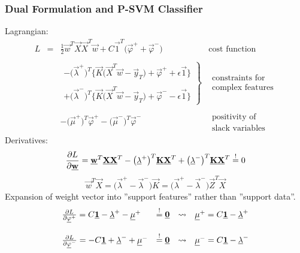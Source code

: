 \subsubsection{Dual Formulation and P-SVM Classifier}
Lagrangian:
\begin{equation}
	\begin{array}{lllc}
	L 
	& = & \frac{1}{2} \vec{w}^T \vec{X} \vec{X}^T \vec{w} + 
		C \vec{1}^T \big( \vec{\varphi}^+ + \vec{\varphi}^- \big)
		& \text{cost function} \\\\
	&& \left. \begin{array}{l}
		- \big( \vec{\lambda}^+ \big)^T \Big\{
			\vec{K} \big( \vec{X}^T \vec{w} - \vec{y}_T \big)
			+ \vec{\varphi}^+ + \epsilon \vec{1} \Big\} \\\\
		+ \big( \vec{\lambda}^- \big)^T \Big\{
			\vec{K}\big( \vec{X}^T \vec{w} - \vec{y}_T \big)
			+ \vec{\varphi}^- - \epsilon \vec{1} \Big\}
	\end{array} \right \} & \substack{ \text{constraints for} \\
					\text{complex features} } \\\\
	&& - \big( \vec{\mu}^+ \big)^T \vec{\varphi}^+ - \big( \vec{\mu}^-
		\big)^T \vec{\varphi}^-
		& \substack{ \text{positivity of} \\
				\text{slack variables} }
	\end{array}
\end{equation}
Derivatives:
\begin{equation}
	\frac{\partial L}{\partial \underline{\mathbf{w}}} = \underline{\mathbf{w}}^T \underline{\mathbf{X}} \underline{\mathbf{X}}^T
		- \big( \underline{\mathbf{\lambda}}^+ \big)^T \underline{\mathbf{K}} \underline{\mathbf{X}}^T
		+ \big( \underline{\mathbf{\lambda}}^- \big)^T \underline{\mathbf{K}} \underline{\mathbf{X}}^T 
	\stackrel{\mathrm{!}}{=} 0
\end{equation}
\begin{equation}
	\vec{w}^T \vec{X} = \big( \vec{\lambda}^+ - \vec{\lambda}^- \big)
		\vec{K} = \big( \vec{\lambda}^+ - \vec{\lambda}^- \big)
		\vec{Z}^T \vec{X}
\end{equation}
Expansion of weight vector into ''support features'' rather than ''support data''. 
\begin{equation}
	\begin{array}{llll}
	\frac{\partial L}{\partial \underline{\mathbf{\varphi}}^+} 
		= C \underline{\mathbf{1}} - \underline{\mathbf{\lambda}}^+ - \underline{\mathbf{\mu}}^+ & \stackrel{\mathrm{!}}{=} \underline{\mathbf{0}}
	& \leadsto & 
		\underline{\mathbf{\mu}}^+ = C \underline{\mathbf{1}} - \underline{\mathbf{\lambda}}^+ \\\\
	\frac{\partial L}{\partial \underline{\mathbf{\varphi}}^-}
		= -C \underline{\mathbf{1}} + \underline{\mathbf{\lambda}}^- + \underline{\mathbf{\mu}}^- & \stackrel{\mathrm{!}}{=} \underline{\mathbf{0}}
	& \leadsto & 
		\underline{\mathbf{\mu}}^- = C \underline{\mathbf{1}} - \underline{\mathbf{\lambda}}^-
	\end{array}
\end{equation}
